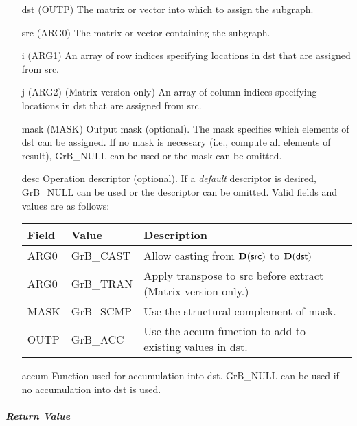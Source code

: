 \begin{itemize}[leftmargin=1.1in]
    \item[{\sf dst}]   ({\sf OUTP}) The matrix or vector into which to assign the subgraph.
    \item[{\sf src}]   ({\sf ARG0}) The matrix or vector containing the subgraph.
    \item[{\sf i}]     ({\sf ARG1}) An array of row indices specifying locations in dst that
                       are assigned from src.
    \item[{\sf j}]     ({\sf ARG2}) (Matrix version only) An array of column indices 
                       specifying locations in dst that are assigned from src.

    \item[{\sf mask}]  (MASK) Output mask (optional). The mask
    specifies which elements of {\sf dst} can be assigned.
    If no mask is necessary (i.e., compute all elements of result),
    {\sf GrB\_NULL} can be used or the mask can be omitted.

    \item[{\sf desc}]   Operation descriptor (optional). If a
    \emph{default} descriptor is desired, {\sf GrB\_NULL} can be
    used or the descriptor can be omitted.  Valid fields and values are as follows: \\
    \begin{tabular}{lll}
    Field  & Value & Description \\
    \hline
    {\sf ARG0} & {\sf GrB\_CAST} & Allow casting from $\bold{D}({\sf src})$ to $\bold{D}({\sf dst})$ \\
    {\sf ARG0} & {\sf GrB\_TRAN} & Apply transpose to {\sf src} before extract (Matrix version only.) \\
    {\sf MASK} & {\sf GrB\_SCMP} & Use the structural complement of {\sf mask}. \\
    {\sf OUTP}& {\sf GrB\_ACC}  & Use the {\sf accum} function to add to existing values in {\sf dst}.\\
    \end{tabular}

    \item[{\sf accum}] Function used for accumulation into dst.  {\sf GrB\_NULL}
                       can be used if no accumulation into dst is used.
\end{itemize}

\subparagraph{Return Value}



